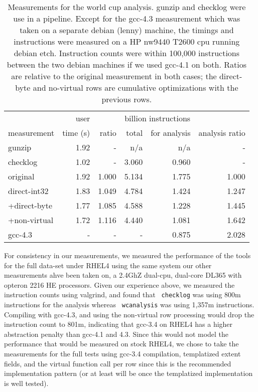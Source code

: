 \begin{table*}
\centering
\begin{tabular}{|l|r|r|r|r|r|}
\hline
             & user     &       & \multicolumn{2}{c|}{billion instructions} & \\
measurement  & time (s) & ratio & total & for analysis & analysis ratio \\
\hline
gunzip       & 1.92     &   -   &   n/a &   n/a &   -   \\
checklog     & 1.02     &   -   & 3.060 & 0.960 &   -   \\
\hline
original     & 1.92     & 1.000	& 5.134 & 1.775 & 1.000 \\
direct-int32 & 1.83     & 1.049 & 4.784 & 1.424 & 1.247 \\
+direct-byte & 1.77     & 1.085 & 4.588 & 1.228 & 1.445 \\
+non-virtual & 1.72     & 1.116 & 4.440 & 1.081 & 1.642 \\
\hline
gcc-4.3      &  -       &   -   &   -   & 0.875 & 2.028 \\
\hline
\end{tabular}

\caption{
Measurements for the world cup analysis.  gunzip and checklog were use
in a pipeline.  Except for the gcc-4.3 measurement which was taken on
a separate debian (lenny) machine, the timings and instructions were
measured on a HP nw9440 T2600 cpu running debian etch.  Instruction
counts were within 100,000 instructions between the two debian
machines if we used gcc-4.1 on both. Ratios are relative to the
original measurement in both cases; the direct-byte and no-virtual
rows are cumulative optimizations with the previous rows.}

\label{table:wc1998:optimize}
\end{table*}

For consistency in our measurements, we measured the performance of
the tools for the full data-set under RHEL4 using the same system our
other measurements ahve been taken on, a 2.4GhZ dual-cpu, dual-core
DL365 with opteron 2216 HE processors.  Given our experience above, we
measured the instruction counts using valgrind, and found that {\tt
checklog} was using 800m instructions for the analysis whereas {\tt
wcanalysis} was using 1,357m instructions.  Compiling with gcc-4.3,
and using the non-virtual row processing would drop the instruction
count to 801m, indicating that gcc-3.4 on RHEL4 has a higher
abstraction penalty than gcc-4.1 and 4.3.  Since this would not model
the performance that would be measured on stock RHEL4, we chose to
take the measurements for the full tests using gcc-3.4 compilation,
templatized extent fields, and the virtual function call per row since
this is the recommended implementation pattern (or at least will be
once the templatized implementation is well tested).

